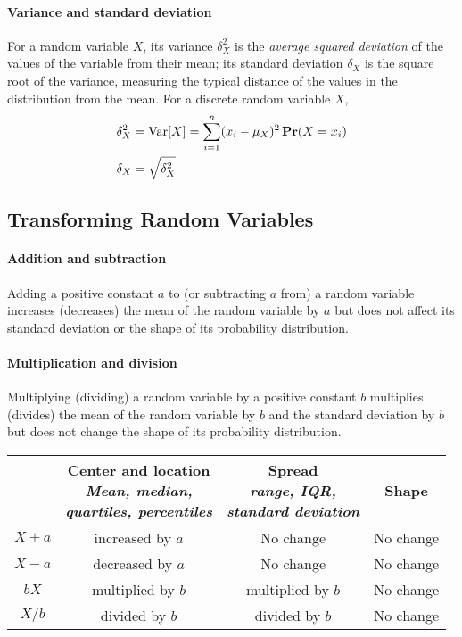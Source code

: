 \paragraph{Variance and standard deviation} For a random variable $X$, its variance $\delta_X^2$ is the \textit{average squared deviation} of the values of the variable from their mean; its standard deviation $\delta_X$ is the square root of the variance, measuring the typical distance of the values in the distribution from the mean. For a discrete random variable $X$,
\begin{align*}
    \delta_X^2 &= \mathop{\mathrm{Var}}[X] = \sum_{i=1}^{n} (x_i - \mu_X)^2 \mathop{\mathbf{Pr}}(X=x_i) \\
    \delta_X   &= \sqrt{\delta_X^2}
\end{align*}

\subsection{Transforming Random Variables}

\paragraph{Addition and subtraction} Adding a positive constant $a$ to (or subtracting $a$ from) a random variable increases (decreases) the mean of the random variable by $a$ but does not affect its standard deviation or the shape of its probability distribution.

\paragraph{Multiplication and division} Multiplying (dividing) a random variable by a positive constant $b$ multiplies (divides) the mean of the random variable by $b$ and the standard deviation by $b$ but does not change the shape of its probability distribution.

\begin{table}[ht!]
    \centering
    \begin{tabular}{cccc}
        \toprule
        & \makecell{Center and location\\\textit{Mean, median,}\\\textit{quartiles, percentiles}}
        & \makecell{Spread\\\textit{range, IQR,}\\\textit{standard deviation}}
        & Shape \\
        \midrule
        $X + a$ & increased by $a$ & No change & No change \\
        $X - a$ & decreased by $a$ & No change & No change \\
        $bX$    & multiplied by $b$ & multiplied by $b$ & No change \\
        $X/b$   & divided by $b$ & divided by $b$ & No change \\
        \bottomrule
    \end{tabular}
\end{table}

